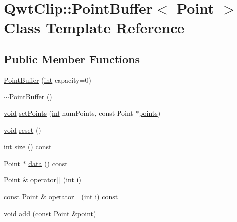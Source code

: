 \hypertarget{class_qwt_clip_1_1_point_buffer}{\section{Qwt\-Clip\-:\-:Point\-Buffer$<$ Point $>$ Class Template Reference}
\label{class_qwt_clip_1_1_point_buffer}
}
\subsection*{Public Member Functions}
\begin{DoxyCompactItemize}
\item 
\hyperlink{class_qwt_clip_1_1_point_buffer_a129f2a3b83a70a939a091f21e550afbd}{Point\-Buffer} (\hyperlink{ioapi_8h_a787fa3cf048117ba7123753c1e74fcd6}{int} capacity=0)
\item 
\hyperlink{class_qwt_clip_1_1_point_buffer_a14ee0e9284d3a33692aee4bd96e9c6e4}{$\sim$\-Point\-Buffer} ()
\item 
\hyperlink{group___u_a_v_objects_plugin_ga444cf2ff3f0ecbe028adce838d373f5c}{void} \hyperlink{class_qwt_clip_1_1_point_buffer_aaa3d2f06b1f9691bf262afdb1fdcbf11}{set\-Points} (\hyperlink{ioapi_8h_a787fa3cf048117ba7123753c1e74fcd6}{int} num\-Points, const Point $\ast$\hyperlink{glext_8h_ae75d9f560170dfeaadc8718c87f5fbec}{points})
\item 
\hyperlink{group___u_a_v_objects_plugin_ga444cf2ff3f0ecbe028adce838d373f5c}{void} \hyperlink{class_qwt_clip_1_1_point_buffer_a093007119a361aee969420cdc20dc48b}{reset} ()
\item 
\hyperlink{ioapi_8h_a787fa3cf048117ba7123753c1e74fcd6}{int} \hyperlink{class_qwt_clip_1_1_point_buffer_aaf0c4b17f8cb3b74e2e31c63118f55af}{size} () const 
\item 
Point $\ast$ \hyperlink{class_qwt_clip_1_1_point_buffer_a1dd45acf0b79141a9f1e87d4698f5369}{data} () const 
\item 
Point \& \hyperlink{class_qwt_clip_1_1_point_buffer_ac7540ac765b2d9928ae3122fee9f57bd}{operator\mbox{[}$\,$\mbox{]}} (\hyperlink{ioapi_8h_a787fa3cf048117ba7123753c1e74fcd6}{int} \hyperlink{uavobjecttemplate_8m_a6f6ccfcf58b31cb6412107d9d5281426}{i})
\item 
const Point \& \hyperlink{class_qwt_clip_1_1_point_buffer_ae8cddb876802b6ca97287772da9df11d}{operator\mbox{[}$\,$\mbox{]}} (\hyperlink{ioapi_8h_a787fa3cf048117ba7123753c1e74fcd6}{int} \hyperlink{uavobjecttemplate_8m_a6f6ccfcf58b31cb6412107d9d5281426}{i}) const 
\item 
\hyperlink{group___u_a_v_objects_plugin_ga444cf2ff3f0ecbe028adce838d373f5c}{void} \hyperlink{class_qwt_clip_1_1_point_buffer_aaf599d3b4301691d48c5a19aedc1ef62}{add} (const Point \&point)
\end{DoxyCompactItemize}


